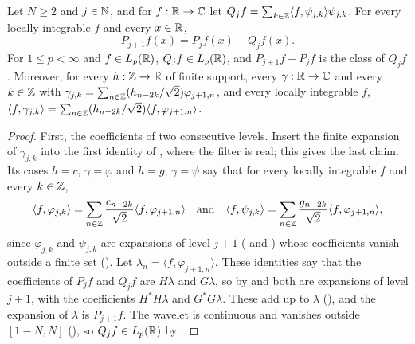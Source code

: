 \begin{theorem}
\label{thm:daub-block-identity}
\leanok
{}
Let $N \geq 2$ and $j \in \mathbb{N}$, and for $f : \mathbb{R} \to \mathbb{C}$ let
$Q_j f = \sum_{k \in \mathbb{Z}} \langle f, \psi_{j,k} \rangle \psi_{j,k}$. For every locally integrable
$f$ and every $x \in \mathbb{R}$,
\[
  P_{j+1} f(x) = P_j f(x) + Q_j f(x) .
\]
For $1 \leq p < \infty$ and $f \in L_p(\mathbb{R})$, $Q_j f \in L_p(\mathbb{R})$, and $P_{j+1} f - P_j f$ is the
class of $Q_j f$. Moreover, for every $h : \mathbb{Z} \to \mathbb{R}$ of finite support, every
$\gamma : \mathbb{R} \to \mathbb{C}$ and every $k \in \mathbb{Z}$ with
$\gamma_{j,k} = \sum_{n \in \mathbb{Z}} (h_{n-2k}/\sqrt 2) \varphi_{j+1,n}$, and every locally
integrable $f$,
$\langle f, \gamma_{j,k} \rangle
= \sum_{n \in \mathbb{Z}} (h_{n-2k}/\sqrt 2) \langle f, \varphi_{j+1,n} \rangle$.
\end{theorem}

\begin{proof}
\leanok
{}
First, the coefficients of two consecutive levels. Insert the finite expansion of
$\gamma_{j,k}$ into the first identity of , where the filter is
real; this gives the last claim. Its cases $h = c$, $\gamma = \varphi$ and $h = g$,
$\gamma = \psi$ say that for every locally integrable $f$ and every $k \in \mathbb{Z}$,
\[
  \langle f, \varphi_{j,k} \rangle
  = \sum_{n \in \mathbb{Z}} \frac{c_{n-2k}}{\sqrt 2} \langle f, \varphi_{j+1,n} \rangle
  \quad\text{and}\quad
  \langle f, \psi_{j,k} \rangle
  = \sum_{n \in \mathbb{Z}} \frac{g_{n-2k}}{\sqrt 2} \langle f, \varphi_{j+1,n} \rangle ,
\]
since $\varphi_{j,k}$ and $\psi_{j,k}$ are expansions of level $j + 1$
( and ) whose coefficients vanish
outside a finite set (). Let
$\lambda_n = \langle f, \varphi_{j+1,n} \rangle$. These identities say that the coefficients of
$P_j f$ and $Q_j f$ are $H \lambda$ and $G \lambda$, so by
 and  both are expansions of level
$j + 1$, with the coefficients $H^* H \lambda$ and $G^* G \lambda$. These add up to $\lambda$
(), and the expansion of $\lambda$ is $P_{j+1} f$. The
wavelet is continuous and vanishes outside $[1 - N, N]$ (), so
$Q_j f \in L_p(\mathbb{R})$ by .
\end{proof}

